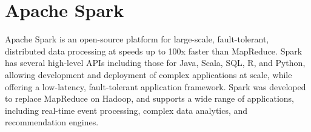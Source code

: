 \section{Apache Spark}

Apache Spark is an open-source platform for large-scale, fault-tolerant, 
distributed data processing at speeds up to 100x faster than MapReduce. \cite{hid-sp18-407-spark}
Spark has several high-level APIs including those for 
Java, Scala, SQL, R, and Python, allowing development and deployment of 
complex applications at scale, while offering a low-latency, fault-tolerant 
application framework. \cite{hid-sp18-407-spark}
Spark was developed to replace MapReduce on Hadoop, and 
supports a wide range of applications, including real-time event processing, 
complex data analytics, and recommendation engines.  \cite{hid-sp18-407-spark}
